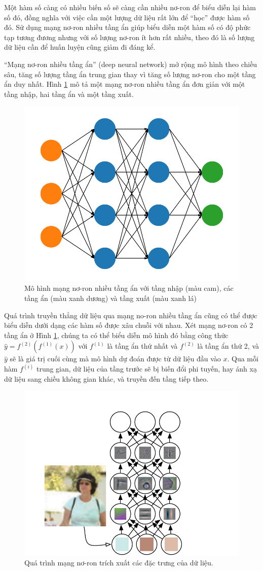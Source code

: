 Một hàm số càng có nhiều biến số sẽ càng cần nhiều nơ-ron để biểu diễn lại hàm số đó, đồng nghĩa với việc cần một lượng dữ liệu rất lớn để ``học'' được hàm số đó. Sử dụng mạng nơ-ron nhiều tầng ẩn giúp biểu diễn một hàm số có độ phức tạp tương đương nhưng với số lượng nơ-ron ít hơn rất nhiều, theo đó là số lượng dữ liệu cần để huấn luyện cũng giảm đi đáng kể\cite{bengio2007scaling}.

``Mạng nơ-ron nhiều tầng ẩn'' (deep neural network) mở rộng mô hình theo chiều sâu, tăng số lượng tầng ẩn trung gian thay vì tăng số lượng nơ-ron cho một tầng ẩn duy nhất. Hình \ref{fig:dnn} mô tả một mạng nơ-ron nhiều tầng ẩn đơn giản với một tầng nhập, hai tầng ẩn và một tầng xuất.

\begin{figure}[H]
\centering
\includegraphics[width=80 mm]{images/dnn.png}
\caption{Mô hình mạng nơ-ron nhiều tầng ẩn với tầng nhập (màu cam), các tầng ẩn (màu xanh dương) và tầng xuất (màu xanh lá)}
\label{fig:dnn}
\end{figure}

Quá trình truyền thẳng dữ liệu qua mạng no-ron nhiều tầng ẩn cũng có thể được biểu diễn dưới dạng các hàm số được xâu chuỗi với nhau. Xét mạng nơ-ron có 2 tầng ẩn ở Hình \ref{fig:dnn}, chúng ta có thể biểu diễn mô hình đó bằng công thức $\hat{y}=f^{(2)}(f^{(1)}(x))$ với $f^{(1)}$ là tầng ẩn thứ nhất và $f^{(2)}$ là tầng ẩn thứ 2, và $\hat{y}$ sẽ là giá trị cuối cùng mà mô hình dự đoán được từ dữ liệu đầu vào $x$. Qua mỗi hàm $f^{(i)}$ trung gian, dữ liệu của tầng trước sẽ bị biến đổi phi tuyến, hay ánh xạ dữ liệu sang chiều không gian khác, và truyền đến tầng tiếp theo.

\begin{figure}[H]
\centering
\includegraphics[width=80 mm]{images/dnn-features.png}
\caption{Quá trình mạng nơ-ron trích xuất các đặc trưng của dữ liệu\cite{goodfellow2016deeplearning}.}
\label{fig:dnn-features}
\end{figure}

